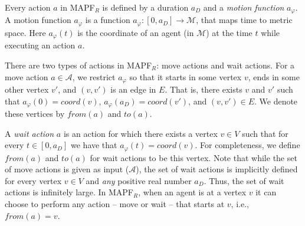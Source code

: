 \documentclass[review]{elsarticle}
\newcommand{\fromv}{\ensuremath{\mathit{from}}\xspace}
\newcommand{\tov}{\ensuremath{\mathit{to}}\xspace}
\newcommand\roni[1]{\nb{\textbf{Roni:}}{green}{#1}}
\newcommand\dor[1]{\nb{\textbf{Dor:}}{Fuchsia}{#1}}
\newcommand{\mapfr}{\ac{MAPF}$_R$\xspace}
\newcommand{\true}{\textit{true}\xspace}
\newcommand{\false}{\textit{false}\xspace}
\newcommand{\coord}{\textit{coord}\xspace}
\newcommand{\iscollision}{\textsc{IsCollision}\xspace}
\begin{document}





Every action $a$ in \mapfr is defined by a duration $a_D$ and a \emph{motion function} $a_\varphi$. 
A motion function $a_\varphi$ is a function $a_\varphi:[0,a_D]\rightarrow \mathcal{M}$, that maps time to metric space. Here $a_\varphi(t)$ is the coordinate of an agent (in $\mathcal{M}$) at the time $t$ while executing an action $a$. 

There are two types of actions in \mapfr: move actions and wait actions. 
For a move action $a\in \mathcal{A}$, we restrict $a_\varphi$ so that it starts in some vertex $v$, 
ends in some other vertex $v'$, and $(v,v')$ is an edge in $E$. 
That is, there exists $v$ and $v'$ such that $a_\varphi(0)=\coord(v)$, $a_\varphi(a_D)=\coord(v')$, and $(v,v')\in E$.
We denote these vertices by $\fromv(a)$ and $\tov(a)$.  

A \emph{wait action} $a$ is an action for which there exists a vertex $v\in V$ such that for every $t\in [0,a_D]$ 
we have that $a_\varphi(t)=\coord(v)$. 
For completeness, we define $\fromv(a)$ and $\tov(a)$ for wait actions to be this vertex. 
Note that while the set of move actions is given as input ($\mathcal{A}$), 
the set of wait actions is implicitly defined for every vertex $v\in V$ and \emph{any} positive real number $a_D$. 
Thus, the set of wait actions is infinitely large.
In \mapfr, when an agent is at a vertex $v$ it can choose to perform any action -- move or wait -- that starts at $v$, i.e., $\fromv(a)=v$. 
\end{document}
